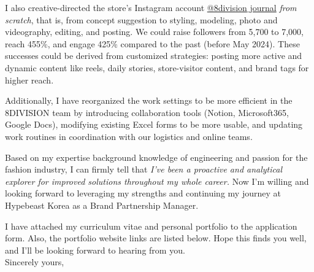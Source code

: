 \documentclass[a4paper,10pt]{extarticle}
\begin{document}
I also creative-directed the store's Instagram account \href{https://instagram.com/8division_journal}{@8division$\_$journal} \textit{from scratch}, that is, from concept suggestion to styling, modeling, photo and videography, editing, and posting. We could raise followers from 5,700 to 7,000, reach 455\%, and engage 425\% compared to the past (before May 2024). These successes could be derived from customized strategies: posting more active and dynamic content like reels, daily stories, store-visitor content, and brand tags for higher reach.

Additionally, I have reorganized the work settings to be more efficient in the 8DIVISION team by introducing collaboration tools (Notion, Microsoft365, Google Docs), modifying existing Excel forms to be more usable, and updating work routines in coordination with our logistics and online teams.

Based on my expertise background knowledge of engineering and passion for the fashion industry, I can firmly tell that \textit{I've been a proactive and analytical explorer for improved solutions throughout my whole career.} Now I'm willing and looking forward to leveraging my strengths and continuing my journey at Hypebeast Korea as a Brand Partnership Manager.

I have attached my curriculum vitae and personal portfolio to the application form. Also, the portfolio website links are listed below. Hope this finds you well, and I'll be looking forward to hearing from you.\\


Sincerely yours,\\
\end{document}
